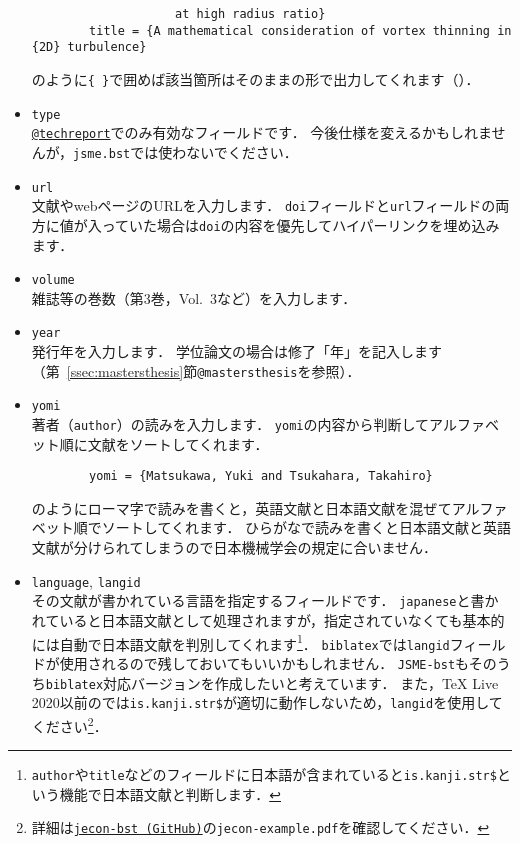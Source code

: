 \documentclass[a4paper,fleqn,uplatex,dvipdfmx]{jsarticle}
\newcommand{\jsmefile}{\texttt{jsme.bst}}
\newcommand{\JSMErepos}{\texttt{JSME-bst}}
\begin{document}
\begin{itemize}
\begin{verbatim}
                    at high radius ratio}
        title = {A mathematical consideration of vortex thinning in {2D} turbulence}
        \end{verbatim}
        のように\verb|{ }|で囲めば該当箇所はそのままの形で出力してくれます（\citealp{Matsukawa:PoF2022,Yoneda:arXiv2016}）．
    \item \verb|type| \\
        \hyperref[ssec:techreport]{\texttt{@techreport}}でのみ有効なフィールドです．
        今後仕様を変えるかもしれませんが，\jsmefile では使わないでください．
    \item \verb|url| \\
        文献やwebページのURLを入力します．
        \verb|doi|フィールドと\verb|url|フィールドの両方に値が入っていた場合は\verb|doi|の内容を優先してハイパーリンクを埋め込みます．
    \item \verb|volume| \\
        雑誌等の巻数（第3巻，Vol.~3など）を入力します．
    \item \verb|year| \\
        発行年を入力します．
        学位論文の場合は修了「年」を記入します（第~\ref{ssec:mastersthesis}節\verb|@mastersthesis|を参照）．
    \item \verb|yomi| \\
        著者（\verb|author|）の読みを入力します．
        \verb|yomi|の内容から判断してアルファベット順に文献をソートしてくれます．
        \begin{verbatim}
        yomi = {Matsukawa, Yuki and Tsukahara, Takahiro}
        \end{verbatim}
        のようにローマ字で読みを書くと，英語文献と日本語文献を混ぜてアルファベット順でソートしてくれます．
        ひらがなで読みを書くと日本語文献と英語文献が分けられてしまうので日本機械学会の規定に合いません．
    \item \verb|language|, \verb|langid| \\
        その文献が書かれている言語を指定するフィールドです．
        \verb|japanese|と書かれていると日本語文献として処理されますが，指定されていなくても基本的には自動で日本語文献を判別してくれます\footnote{\texttt{author}や\texttt{title}などのフィールドに日本語が含まれていると\texttt{is.kanji.str\$}という機能で日本語文献と判断します．}．
        \verb|biblatex|では\verb|langid|フィールドが使用されるので残しておいてもいいかもしれません．
        \JSMErepos もそのうち\verb|biblatex|対応バージョンを作成したいと考えています．
        また，TeX Live 2020以前の\upBibTeX{}では\verb|is.kanji.str$|が適切に動作しないため，\verb|langid|を使用してください\footnote{詳細は\href{https://github.com/ShiroTakeda/jecon-bst}{\texttt{jecon-bst (GitHub)}}の\texttt{jecon-example.pdf}を確認してください．}．
\end{itemize}
\end{document}
